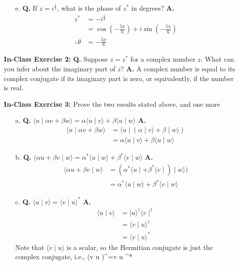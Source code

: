 \documentclass[main.tex]{subfiles}
\begin{document}
\begin{enumerate}
\begin{enumerate}
        \item[e.] \textbf{Q.} If $z=i^{\frac{1}{3}}$, what is the phase of $z^{*}$ in degrees? \textbf{A.}
        \begin{align*}
            z^{*} &= -i^{\frac{1}{3}}\\
                    &= \cos \left(-\frac{5 \pi}{6}\right)+i \sin \left(-\frac{5 \pi}{6}\right)\\
            \therefore \theta &= -\frac{5\pi}{6}
        \end{align*}
    \end{enumerate}

\item[] \textbf{In-Class Exercise 2:} \textbf{Q.} Suppose $z=z^{*}$ for a complex number $z$. What can you infer about the imaginary part of $z$? \textbf{A.} A complex number is equal to its complex conjugate if its imaginary part is zero, or equivalently, if the number is real. 

\item[] \textbf{In-Class Exercise 3:} Prove the two results stated above, and one more

    \begin{enumerate}
        \item[a.] \textbf{Q.} $\langle u \mid \alpha v+\beta w\rangle=\alpha\langle u \mid v\rangle+\beta\langle u \mid w\rangle$ \textbf{A.}
        \begin{align*}
            \langle u \mid \alpha v+\beta w\rangle &= \langle u \mid (\alpha \mid v \rangle + \beta \mid w\rangle)\\
            &=\alpha\langle u \mid v\rangle+\beta\langle u \mid w\rangle
        \end{align*}
        
        \item[b.] \textbf{Q.} $\langle\alpha u+\beta v \mid w\rangle=\alpha^{*}\langle u \mid w\rangle+\beta^{*}\langle v \mid w\rangle$ \textbf{A.}
        \begin{align*}
            \langle\alpha u+\beta v \mid w\rangle &= (\alpha^{*}\langle u \mid + \beta^{*} \langle v \mid) \mid w\rangle)\\
            &=\alpha^{*}\langle u \mid w\rangle+\beta^{*}\langle v \mid w\rangle
        \end{align*}
        
        \item[c.] \textbf{Q.} $\langle u \mid v\rangle=\langle v \mid u\rangle^{*}$ \textbf{A.}
        \begin{align*}
            \langle u \mid v \rangle & = \mid u \rangle^{\dagger}  \langle v \mid^{\dagger}\\
            &=\langle v \mid u\rangle^{\dagger}\\
            &=\langle v \mid u\rangle^{*}
        \end{align*}   
        Note that $\langle v \mid u \rangle$ is a scalar, so the Hermitian conjugate is just the complex conjugate, i.e., (\langle v \mid u \rangle)^{\dagger}=\langle v \mid u \rangle^{*}
        

\end{enumerate}
\end{enumerate}
\end{document}
